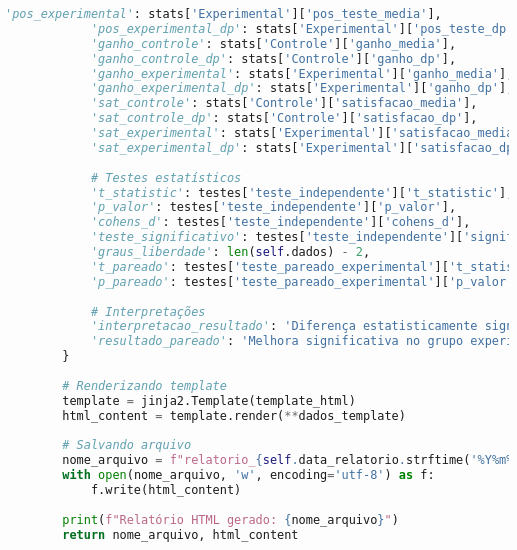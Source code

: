 \begin{pythonbox}
\begin{lstlisting}[language=Python]                   
            'pos_experimental': stats['Experimental']['pos_teste_media'],
            'pos_experimental_dp': stats['Experimental']['pos_teste_dp'],
            'ganho_controle': stats['Controle']['ganho_media'],
            'ganho_controle_dp': stats['Controle']['ganho_dp'],
            'ganho_experimental': stats['Experimental']['ganho_media'],
            'ganho_experimental_dp': stats['Experimental']['ganho_dp'],
            'sat_controle': stats['Controle']['satisfacao_media'],
            'sat_controle_dp': stats['Controle']['satisfacao_dp'],
            'sat_experimental': stats['Experimental']['satisfacao_media'],
            'sat_experimental_dp': stats['Experimental']['satisfacao_dp'],
            
            # Testes estatísticos
            't_statistic': testes['teste_independente']['t_statistic'],
            'p_valor': testes['teste_independente']['p_valor'],
            'cohens_d': testes['teste_independente']['cohens_d'],
            'teste_significativo': testes['teste_independente']['significativo'],
            'graus_liberdade': len(self.dados) - 2,
            't_pareado': testes['teste_pareado_experimental']['t_statistic'],
            'p_pareado': testes['teste_pareado_experimental']['p_valor'],
            
            # Interpretações
            'interpretacao_resultado': 'Diferença estatisticamente significativa entre os grupos' if testes['teste_independente']['significativo'] else 'Não há diferença estatisticamente significativa entre os grupos',
            'resultado_pareado': 'Melhora significativa no grupo experimental' if testes['teste_pareado_experimental']['significativo'] else 'Não há melhora significativa no grupo experimental'
        }
        
        # Renderizando template
        template = jinja2.Template(template_html)
        html_content = template.render(**dados_template)
        
        # Salvando arquivo
        nome_arquivo = f"relatorio_{self.data_relatorio.strftime('%Y%m%d_%H%M%S')}.html"
        with open(nome_arquivo, 'w', encoding='utf-8') as f:
            f.write(html_content)
        
        print(f"Relatório HTML gerado: {nome_arquivo}")
        return nome_arquivo, html_content
\end{lstlisting}
\end{pythonbox}

